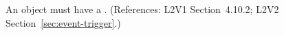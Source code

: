 An \Event object must have a .  (References: L2V1
Section~4.10.2; L2V2 Section~\ref{sec:event-trigger}.)
